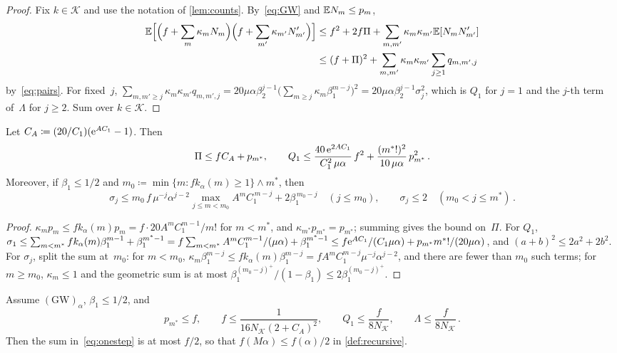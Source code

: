 \documentclass[11pt,letterpaper]{article}
\begin{document}
\begin{proof}
Fix $k\in\mathcal K$ and use the notation of \cref{lem:counts}. By~\eqref{eq:GW} and $\mathbb E N_m\le p_m$,
\begin{align*}
  \mathbb E\Bigl[\Bigl(f+\sum_m\kappa_mN_m\Bigr)\Bigl(f+\sum_{m'}\kappa_{m'}N'_{m'}\Bigr)\Bigr]&\le f^2+2f\Pi+\sum_{m,m'}\kappa_m\kappa_{m'}\mathbb E[N_mN'_{m'}]\\
  &\le(f+\Pi)^2+\sum_{m,m'}\kappa_m\kappa_{m'}\sum_{j\ge1}q_{m,m',j}
\end{align*}
by~\eqref{eq:pairs}. For fixed~$j$, $\sum_{m,m'\ge j}\kappa_m\kappa_{m'}q_{m,m',j}=20\mu\alpha\beta_2^{j-1}\bigl(\sum_{m\ge j}\kappa_m\beta_1^{m-j}\bigr)^2=20\mu\alpha\beta_2^{j-1}\sigma_j^2$, which is $Q_1$ for $j=1$ and the $j$-th term of~$\Lambda$ for $j\ge2$. Sum over $k\in\mathcal K$.
\end{proof}

\begin{lemma}
\label{lem:terms}
Let $C_A\coloneqq(20/C_1)(\mathrm{e}^{AC_1}-1)$. Then
\begin{equation}
\label{eq:termbounds}
  \Pi\le fC_A+p_{m^*},\qquad
  Q_1\le\frac{40\,\mathrm{e}^{2AC_1}}{C_1^2\,\mu\alpha}\,f^2+\frac{(m^*!)^2}{10\,\mu\alpha}\,p_{m^*}^2\,.
\end{equation}
Moreover, if $\beta_1\le1/2$ and $m_0\coloneqq\min\{m\colon fk_\alpha(m)\ge1\}\wedge m^*$, then
\begin{equation*}
  \sigma_j\le m_0\,f\,\mu^{-j}\alpha^{j-2}\max_{j\le m<m_0}A^mC_1^{\,m-j}+2\beta_1^{\,m_0-j}\quad(j\le m_0),\qquad\sigma_j\le2\quad(m_0<j\le m^*)\,.
\end{equation*}
\end{lemma}

\begin{proof}
$\kappa_mp_m\le fk_\alpha(m)p_m=f\cdot20A^mC_1^{m-1}/m!$ for $m<m^*$, and $\kappa_{m^*}p_{m^*}=p_{m^*}$; summing gives the bound on~$\Pi$. For $Q_1$, $\sigma_1\le\sum_{m<m^*}fk_\alpha(m)\beta_1^{m-1}+\beta_1^{m^*-1}=f\sum_{m<m^*}A^mC_1^{m-1}/(\mu\alpha)+\beta_1^{m^*-1}\le f\mathrm{e}^{AC_1}/(C_1\mu\alpha)+p_{m^*}m^*!/(20\mu\alpha)$, and $(a+b)^2\le2a^2+2b^2$. For $\sigma_j$, split the sum at~$m_0$: for $m<m_0$, $\kappa_m\beta_1^{m-j}\le fk_\alpha(m)\beta_1^{m-j}=fA^mC_1^{m-j}\mu^{-j}\alpha^{j-2}$, and there are fewer than $m_0$ such terms; for $m\ge m_0$, $\kappa_m\le1$ and the geometric sum is at most $\beta_1^{(m_0-j)^+}/(1-\beta_1)\le2\beta_1^{(m_0-j)^+}$.
\end{proof}

\begin{corollary}[Halving]
\label{cor:halving}
Assume $\mathrm{(GW)}_\alpha$, $\beta_1\le1/2$, and
\begin{equation}
\label{eq:halvingconds}
  p_{m^*}\le f,\qquad f\le\frac{1}{16N_{\mathcal K}(2+C_A)^2},\qquad Q_1\le\frac{f}{8N_{\mathcal K}},\qquad\Lambda\le\frac{f}{8N_{\mathcal K}}\,.
\end{equation}
Then the sum in~\eqref{eq:onestep} is at most $f/2$, so that $f(M\alpha)\le f(\alpha)/2$ in \cref{def:recursive}.
\end{corollary}
\end{document}
